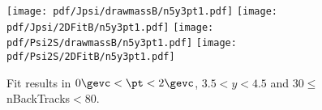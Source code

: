 \begin{figure}[H]
\begin{center}
\texttt{[image: pdf/Jpsi/drawmassB/n5y3pt1.pdf]}
\texttt{[image: pdf/Jpsi/2DFitB/n5y3pt1.pdf]}
\vspace*{-0.5cm}
\texttt{[image: pdf/Psi2S/drawmassB/n5y3pt1.pdf]}
\texttt{[image: pdf/Psi2S/2DFitB/n5y3pt1.pdf]}
\vspace*{-0.5cm}
\end{center}
\caption{Fit results in $0\gevc<\pt<2\gevc$, $3.5<y<4.5$ and 30$\leq$nBackTracks$<$80.}
\label{Fitn5y3pt1}
\end{figure}
